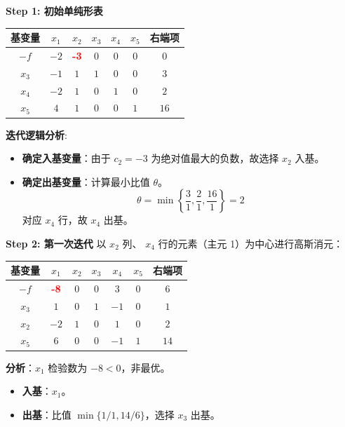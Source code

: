 \documentclass[a4paper,12pt]{ctexart} %
\begin{document}
	\textbf{Step 1: 初始单纯形表}
	
	\begin{table}[H]
		\centering
		\renewcommand{\arraystretch}{1.3}
		\begin{tabular}{c|ccccc|c}
			\toprule
			\textbf{基变量} & $x_1$ & $x_2$ & $x_3$ & $x_4$ & $x_5$ & \textbf{右端项} \\
			\hline
			$-f$ & $-2$ & \textcolor{red}{\textbf{-3}} & $0$ & $0$ & $0$ & $0$ \\
			\hline
			$x_3$ & $-1$ & $1$ & $1$ & $0$ & $0$ & $3$ \\
			$x_4$ & $-2$ & $1$ & $0$ & $1$ & $0$ & $2$ \\
			$x_5$ & $4$ & $1$ & $0$ & $0$ & $1$ & $16$ \\
			\bottomrule
		\end{tabular}
	\end{table}
	
	\textbf{迭代逻辑分析}:
	\begin{itemize}
		\item \textbf{确定入基变量}：由于 $c_2 = -3$ 为绝对值最大的负数，故选择 \textbf{$x_2$} 入基。
		\item \textbf{确定出基变量}：计算最小比值 $\theta$。
		\[ \theta = \min \left\{ \frac{3}{1}, \frac{2}{1}, \frac{16}{1} \right\} = 2 \]
		对应 $x_4$ 行，故 \textbf{$x_4$} 出基。
	\end{itemize}
	
	\textbf{Step 2: 第一次迭代}
	以 $x_2$ 列、 $x_4$ 行的元素（主元 1）为中心进行高斯消元：
	
	\begin{table}[H]
		\centering
		\renewcommand{\arraystretch}{1.3}
		\begin{tabular}{c|ccccc|c}
			\toprule
			\textbf{基变量} & $x_1$ & $x_2$ & $x_3$ & $x_4$ & $x_5$ & \textbf{右端项} \\
			\hline
			$-f$ & \textcolor{red}{\textbf{-8}} & $0$ & $0$ & $3$ & $0$ & $6$ \\
			\hline
			$x_3$ & $1$ & $0$ & $1$ & $-1$ & $0$ & $1$ \\
			$x_2$ & $-2$ & $1$ & $0$ & $1$ & $0$ & $2$ \\
			$x_5$ & $6$ & $0$ & $0$ & $-1$ & $1$ & $14$ \\
			\bottomrule
		\end{tabular}
	\end{table}
	
	\textbf{分析}：$x_1$ 检验数为 $-8 < 0$，非最优。
	\begin{itemize}
		\item \textbf{入基}：\textbf{$x_1$}。
		\item \textbf{出基}：比值 $\min\{1/1, 14/6\}$，选择 \textbf{$x_3$} 出基。
	\end{itemize}
	
\end{document}

